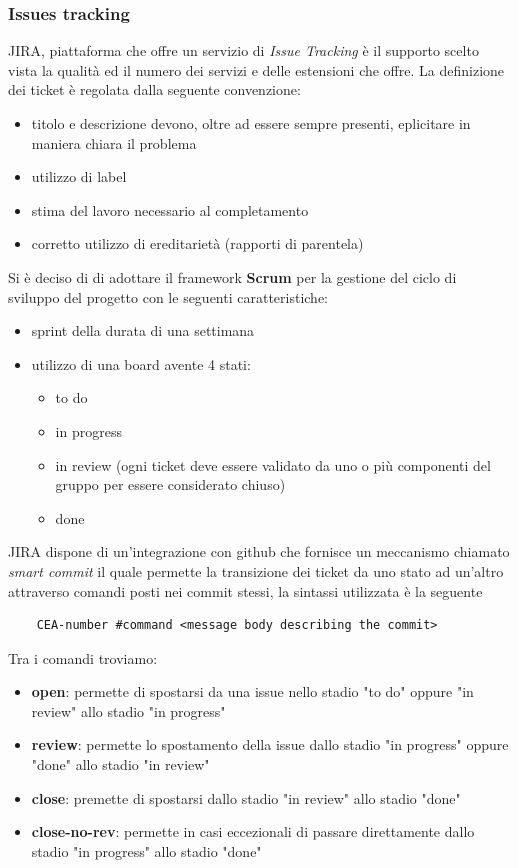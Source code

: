 	\subsubsection{Issues tracking}
	JIRA, piattaforma che offre un servizio di \textit{Issue Tracking} è il supporto scelto vista la qualità ed il numero dei servizi e delle estensioni che offre.
	\newline
	La definizione dei ticket è regolata dalla seguente convenzione:
	\begin{itemize}
		\item titolo e descrizione devono, oltre ad essere sempre presenti, eplicitare in maniera chiara il problema
		\item utilizzo di label
		\item stima del lavoro necessario al completamento
		\item corretto utilizzo di ereditarietà (rapporti di parentela)
	\end{itemize}
	Si è deciso di di adottare il framework \textbf{Scrum} per la gestione del ciclo di sviluppo del progetto con le seguenti caratteristiche:
	\begin{itemize}
		\item sprint della durata di una settimana
		\item utilizzo di una board avente 4 stati:
		\begin{itemize}
			\item to do
			\item in progress
			\item in review (ogni ticket deve essere validato da uno o più componenti del gruppo per essere considerato chiuso)
			\item done
		\end{itemize}
	\end{itemize}

	JIRA dispone di un'integrazione con github che fornisce un meccanismo chiamato \textit{smart commit} il quale permette la transizione dei ticket da uno stato ad un'altro attraverso comandi posti nei commit stessi, la sintassi utilizzata è la seguente
	\begin{lstlisting}
	CEA-number #command <message body describing the commit>
	\end{lstlisting}
	Tra i comandi troviamo:
	\begin{itemize}
		\item \textbf{open}: permette di spostarsi da una issue nello stadio "to do" oppure "in review" allo stadio "in progress"
		\item \textbf{review}: permette lo spostamento della issue dallo stadio "in progress" oppure "done" allo stadio "in review"
		\item \textbf{close}: premette di spostarsi dallo stadio "in review" allo stadio "done"
		\item \textbf{close-no-rev}: permette in casi eccezionali di passare direttamente dallo stadio "in progress" allo stadio "done"
	\end{itemize}